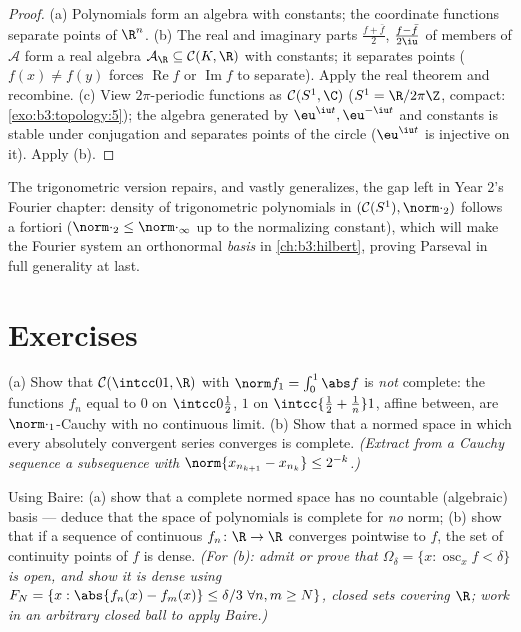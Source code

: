 \begin{proof}
(a) Polynomials form an algebra with constants; the coordinate
functions separate points of $\R^n$.
(b) The real and imaginary parts $\frac{f + \bar f}2$,
$\frac{f - \bar f}{2\iu}$ of members of $\mathcal A$ form a
real algebra $\mathcal A_\R \subseteq \mathcal C(K, \R)$ with
constants; it separates points ($f(x) \ne f(y)$ forces
$\operatorname{Re}f$ or $\operatorname{Im}f$ to separate).
Apply the real theorem and recombine.
(c) View $2\pi$-periodic functions as $\mathcal C(S^1, \C)$
($S^1 = \R/2\pi\Z$, compact:
\cref{exo:b3:topology:5}); the algebra generated by
$\eu^{\iu t}, \eu^{-\iu t}$ and constants is stable under
conjugation and separates points of the circle ($\eu^{\iu t}$
is injective on it). Apply (b).
\end{proof}

\begin{remark}\label{rem:b3:complete:swremark}
The trigonometric version repairs, and vastly generalizes, the
gap left in Year 2's Fourier chapter: density of trigonometric
polynomials in $(\mathcal C(S^1), \norm\cdot_2)$ follows a
fortiori ($\norm\cdot_2 \leq \norm\cdot_\infty$ up to the
normalizing constant), which will make the Fourier system an
orthonormal \emph{basis} in \cref{ch:b3:hilbert}, proving
Parseval in full generality at last.
\end{remark}

\section{Exercises}

\begin{exercise}[$\star$]\label{exo:b3:complete:1}
(a) Show that $\mathcal C(\intcc01, \R)$ with
$\norm f_1 = \int_0^1\abs f$ is \emph{not} complete: the
functions $f_n$ equal to $0$ on $\intcc0{\frac12}$, $1$ on
$\intcc{\frac12 + \frac1n}1$, affine between, are
$\norm\cdot_1$-Cauchy with no continuous limit.
(b) Show that a normed space in which every absolutely
convergent series converges is complete. \emph{(Extract from a
Cauchy sequence a subsequence with $\norm{x_{n_{k+1}} -
x_{n_k}} \leq 2^{-k}$.)}
\end{exercise}

\begin{exercise}[$\star$]\label{exo:b3:complete:2}
Using Baire: (a) show that a complete normed space has no
countable (algebraic) basis --- deduce that the space of
polynomials is complete for \emph{no} norm; (b) show that if a
sequence of continuous $f_n \colon \R \to \R$ converges
pointwise to $f$, the set of continuity points of $f$ is dense.
\emph{(For (b): admit or prove that $\Omega_\delta = \{x :
\operatorname{osc}_x f < \delta\}$ is open, and show it is
dense using $F_{N} = \{x: \abs{f_n(x) - f_m(x)} \leq \delta/3\
\forall n,m \geq N\}$, closed sets covering $\R$; work in an
arbitrary closed ball to apply Baire.)}
\end{exercise}

